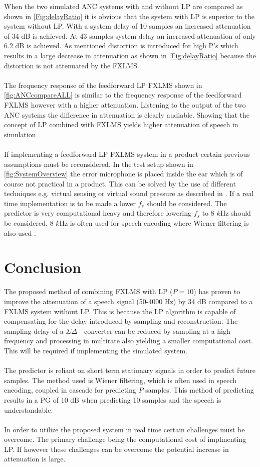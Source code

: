 When the two simulated ANC systems with and without LP are compared as shown in \autoref{Fig:delayRatio} it is obvious that the system with LP is superior to the system without LP. With a system delay of 10 samples an increased attenuation of 34 dB is achieved. At 43 samples system delay an increased attenuation of only 6.2 dB is achieved. As mentioned distortion is introduced for high P's which results in a large decrease in attenuation as shown in \autoref{Fig:delayRatio} because the distortion is not attenuated by the FXLMS.
\\\\
The frequency response of the feedforward LP FXLMS shown in \autoref{fig:ANCcompareALL} is similar to the frequency response of the feedforward FXLMS however with a higher attenuation. Listening to the output of the two ANC systems the difference in attenuation is clearly audiable. Showing that the concept of LP combined with FXLMS yields higher attenuation of speech in simulation     
\\\\
If implementing a feedforward LP FXLMS system in a product certain previous assumptions must be reconsidered. In the test setup shown in \autoref{fig:SystemOverview} the error microphone is placed inside the ear which is of course not practical in a product. This can be solved by the use of different techniques e.g. virtual sensing or virtual sound pressure as described in \cite{Hansen2}. If a real time implementation is to be made a lower $f_s$ should be considered. The predictor is very computational heavy and therefore lowering $f_s$ to 8 $k$Hz should be considered. 8 $k$Hz is often used for speech encoding where Wiener filtering is also used \cite{Speech}.



\section{Conclusion}
The proposed method of combining FXLMS with LP ($P=10$) has proven to improve the attenuation of a speech signal (50-4000 Hz) by 34 dB compared to a FXLMS system without LP. This is because the LP algorithm is capable of compensating for the delay introduced by sampling and reconstruction. The sampling delay of a $\Sigma\Delta$ - converter can be reduced by sampling at a high frequency and processing in multirate also yielding a smaller computational cost. This will be required if implementing the simulated system.    
\\\\
The predictor is reliant on short term stationary signals in order to predict future samples. The method used is Wiener filtering, which is often used in speech encoding, coupled in cascade for predicting $P$ samples. This method of predicting results in a PG of 10 dB when predicting 10 samples and the speech is understandable.    
\\\\
In order to utilize the proposed system in real time certain challenges must be overcome. The primary challenge being the computational cost of implmenting LP. If however these challenges can be overcome the potential increase in attenuation is large.   



